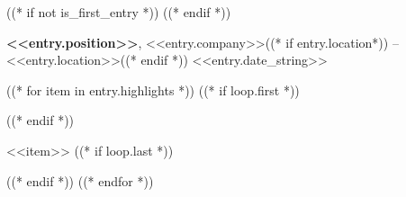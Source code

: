((* if not is_first_entry *))
\vspace{8pt}
((* endif *))

\textbf{<<entry.position>>}, <<entry.company>>((* if entry.location*)) -- <<entry.location>>((* endif *)) \hfill <<entry.date_string>>

((* for item in entry.highlights *))
    ((* if loop.first *))
\begin{highlights}
    ((* endif *))
\item <<item>>
    ((* if loop.last *))
\end{highlights}
    ((* endif *))
((* endfor *))